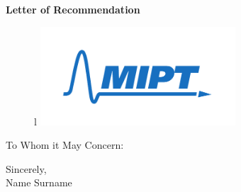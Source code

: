 \documentclass{letter}
\date{}
\begin{document}
\begin{letter}
{
\centering \Large \textbf{Letter of Recommendation}
}

\hfill
\begin{figure}[1]{l}%
    \centering
    \includegraphics[width=0.65\textwidth]{eng.pdf}
\end{figure}

\opening{To Whom it May Concern:} %
\medskip 

\lipsum[1-5]

\medskip
Sincerely, \\
Name Surname \\

\end{letter}
\end{document}
